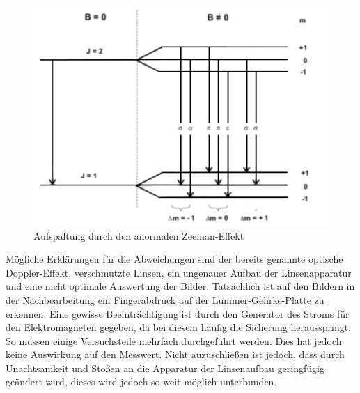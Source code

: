 \begin{figure}[h!]
  \centering
  \includegraphics[width=\textwidth]{anormal.png}
  \caption{Aufspaltung durch den anormalen Zeeman-Effekt \cite{1}}
  \label{fig:normal}
\end{figure}
\FloatBarrier
Mögliche Erklärungen für die Abweichungen sind der bereits genannte optische Doppler-Effekt, verschmutzte Linsen, ein ungenauer Aufbau der Linsenapparatur und eine nicht optimale Auswertung der Bilder.
Tatsächlich ist auf den Bildern in der Nachbearbeitung ein Fingerabdruck auf der Lummer-Gehrke-Platte zu erkennen.
Eine gewisse Beeinträchtigung ist durch den Generator des Stroms für den Elektromagneten gegeben, da bei diesem häufig die Sicherung herausspringt.
So müssen einige Versuchsteile mehrfach durchgeführt werden.
Dies hat jedoch keine Auswirkung auf den Messwert.
Nicht auzuschließen ist jedoch, dass durch Unachtsamkeit und Stoßen an die Apparatur der Linsenaufbau geringfügig geändert wird, dieses wird jedoch so weit möglich unterbunden.
